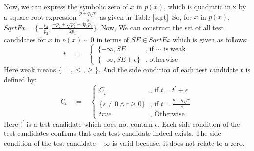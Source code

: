 Now, we can express the symbolic zero of $x$ in $p(x)$, which is quadratic in x by a square root expression $\frac{p+q\sqrt{r}}{s}$ as given in Table \ref{sqrt}.\newline
So, for $x$ in $p(x)$, $SqrtEx=\{-\frac{p_{3}}{p_{2}}, \frac{-p_{2}\pm \sqrt{p_{2}^{2}-4p_{1}p_{3}}}{2p_{1}}\}$. Now, We can construct the set of all test candidates for $x$ in $p(x)\sim 0$ in terms of $SE\in SqrtEx$ which is given as follows:
		$$
		t
\quad = \quad 
\left\{
\begin{array}{ll}
{\displaystyle \{-\infty,SE} 
& 
\text{, if }\sim \text{ is weak }
\\[0.6cm] %
{\displaystyle \{-\infty,SE+\epsilon\}}
& 
\text{, otherwise }
\end{array}
\right.$$
Here weak means $\{=,\leq,\geq\}$.\newline
And the side condition of each test candidate $t$ is defined by:
$$
C_t
\quad = \quad 
\left\{
\begin{array}{lll}
{\displaystyle C_{t^{\prime}}}
& 
\text{, if } t = t^{\prime} + \epsilon
\\[0.6cm] %
{\displaystyle \{s\neq 0 \wedge r\geq 0\}}
& 
\text{, if } t = \frac{p+q\sqrt{r}}{s}
\\[0.6cm] %
{\displaystyle true}
& 
\text{, Otherwise }
\end{array}
\right.$$
Here $t^{\prime}$ is a test candidate which does not contain $\epsilon$.\newline
Each side condition of the test candidates confirms that each test candidate indeed exists. The side condition of the test candidate $-\infty$ is valid because, it does not relate to a zero.
